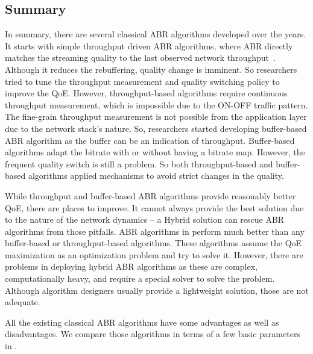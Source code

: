 \subsection{Summary}
In summary, there are several classical \ac{ABR} algorithms developed over the years. It starts with simple throughput driven \ac{ABR} algorithms, where \ac{ABR} directly matches the streaming quality to the last observed network throughput~\cite{5677508,10.1145/1943552.1943575,10.1145/1943552.1943574}. Although it reduces the rebuffering, quality change is imminent. So researchers tried to tune the throughput measurement and quality switching policy to improve the \ac{QoE}. However, throughput-based algorithms require continuous throughput measurement, which is impossible due to the ON-OFF traffic pattern. The fine-grain throughput measurement is not possible from the application layer due to the network stack's nature. So, researchers started developing buffer-based \ac{ABR} algorithm as the buffer can be an indication of throughput. Buffer-based algorithms adapt the bitrate with or without having a bitrate map. However, the frequent quality switch is still a problem. So both throughput-based and buffer-based algorithms applied mechanisms to avoid strict changes in the quality.

While throughput and buffer-based \ac{ABR} algorithms provide reasonably better \ac{QoE}, there are places to improve. It cannot always provide the best solution due to the nature of the network dynamics -- a Hybrid solution can rescue \ac{ABR} algorithms from those pitfalls. \ac{ABR} algorithms in \cite{7247436,140405,yin2015control,10.1145/2670518.2673877} perform much better than any buffer-based or throughput-based algorithms. These algorithms assume the \ac{QoE} maximization as an optimization problem and try to solve it. However, there are problems in deploying hybrid \ac{ABR} algorithms as these are complex, computationally heavy, and require a special solver to solve the problem. Although algorithm designers usually provide a lightweight solution, those are not adequate.

All the existing classical \ac{ABR} algorithms have some advantages as well as disadvantages. We compare those algorithms in terms of a few basic parameters in \tbl{\ref{chap02:tbl:comparison_classical}}.

